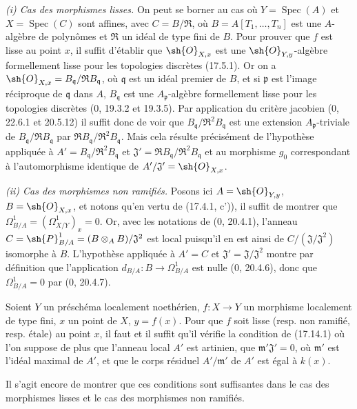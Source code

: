 \emph{(i) Cas des morphismes lisses.} On peut se borner au cas où $Y=\operatorname{Spec}(A)$ et $X=\operatorname{Spec}(C)$ sont affines, avec $C=B/\mathfrak{R}$, où $B=A[T_1,\ldots,T_n]$ est une $A$-algèbre de polynômes et $\mathfrak{R}$ un idéal de type fini de $B$. Pour prouver que $f$ est lisse au point $x$, il suffit d'établir que $\sh{O}_{X,x}$ est une $\sh{O}_{Y,y}$-algèbre formellement lisse pour les topologies discrètes (17.5.1). Or on a $\sh{O}_{X,x}=B_{\mathfrak q}/\mathfrak{R}B_{\mathfrak q}$, où $\mathfrak q$ est un idéal premier de $B$, et si $\mathfrak p$ est l'image réciproque de $\mathfrak q$ dans $A$, $B_{\mathfrak q}$ est une $A_{\mathfrak p}$-algèbre formellement lisse pour les topologies discrètes (0, 19.3.2 et 19.3.5). Par application du critère jacobien (0, 22.6.1 et 20.5.12) il suffit donc de voir que $B_{\mathfrak q}/\mathfrak{R}^2B_{\mathfrak q}$ est une extension $A_{\mathfrak p}$-triviale de $B_{\mathfrak q}/\mathfrak{R}B_{\mathfrak q}$ par $\mathfrak{R}B_{\mathfrak q}/\mathfrak{R}^2B_{\mathfrak q}$. Mais cela résulte précisément de l'hypothèse appliquée à $A'=B_{\mathfrak q}/\mathfrak{R}^2B_{\mathfrak q}$ et $\mathfrak{J}'=\mathfrak{R}B_{\mathfrak q}/\mathfrak{R}^2B_{\mathfrak q}$ et au morphisme $g_0$ correspondant à l'automorphisme identique de $A'/\mathfrak{J}'=\sh{O}_{X,x}$.

\emph{(ii) Cas des morphismes non ramifiés.} Posons ici $A=\sh{O}_{Y,y}$, $B=\sh{O}_{X,x}$, et notons qu'en vertu de (17.4.1, c')), il suffit de montrer que $\Omega^1_{B/A}=(\Omega^1_{X/Y})_x=0$. Or, avec les notations de (0, 20.4.1), l'anneau $C=\sh{P}^1_{B/A}=(B\otimes_A B)/\mathfrak{J}^2$ est local puisqu'il en est ainsi de $C/(\mathfrak{J}/\mathfrak{J}^2)$ isomorphe à $B$. L'hypothèse appliquée à $A'=C$ et $\mathfrak{J}'=\mathfrak{J}/\mathfrak{J}^2$ montre par définition que l'application $d_{B/A}:B\to\Omega^1_{B/A}$ est nulle (0, 20.4.6), donc que $\Omega^1_{B/A}=0$ par (0, 20.4.7).

\begin{proposition}[17.14.2]
\label{IV.17.14.2}
Soient $Y$ un préschéma localement noethérien, $f:X\to Y$ un morphisme localement de type fini, $x$ un point de $X$, $y=f(x)$. Pour que $f$ soit lisse (resp. non ramifié, resp. étale) au point $x$, il faut et il suffit qu'il vérifie la condition de (17.14.1) où l'on suppose de plus que l'anneau local $A'$ est artinien, que $\mathfrak m'\mathfrak{J}'=0$, où $\mathfrak m'$ est l'idéal maximal de $A'$, et que le corps résiduel $A'/\mathfrak m'$ de $A'$ est égal à $k(x)$.
\end{proposition}

Il s'agit encore de montrer que ces conditions sont suffisantes dans le cas des morphismes lisses et le cas des morphismes non ramifiés.

